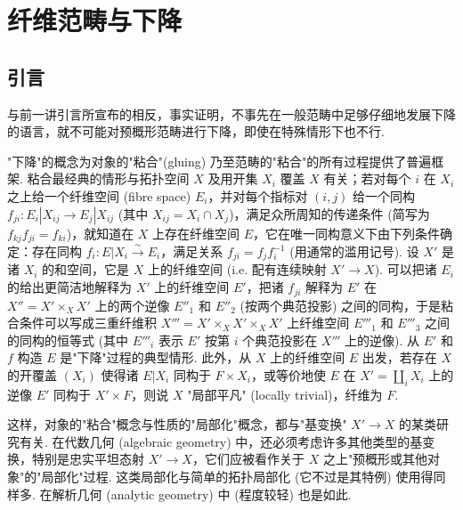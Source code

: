 \chapter{纤维范畴与下降}

\setcounter{section}{-1}

\section{引言}

与前一讲引言所宣布的相反，事实证明，不事先在一般范畴中足够仔细地发展下降的语言，就不可能对预概形范畴进行下降，即使在特殊情形下也不行.

"下降"的概念为对象的"粘合"(gluing) 乃至范畴的"粘合"的所有过程提供了普遍框架. 粘合最经典的情形与拓扑空间 $X$ 及用开集 $X_i$ 覆盖 $X$ 有关；若对每个 $i$ 在 $X_i$ 之上给一个纤维空间 (fibre space) $E_i$，并对每个指标对 $(i, j)$ 给一个同构 $f_{ji} \colon E_i|X_{ij} \to E_j|X_{ij}$ (其中 $X_{ij} = X_i \cap X_j$)，满足众所周知的传递条件 (简写为 $f_{kj} f_{ji} = f_{ki}$)，就知道在 $X$ 上存在纤维空间 $E$，它在唯一同构意义下由下列条件确定：存在同构 $f_i \colon E|X_i \xrightarrow{\sim} E_i$，满足关系 $f_{ji} = f_j f_i^{-1}$ (用通常的滥用记号). 设 $X'$ 是诸 $X_i$ 的和空间，它是 $X$ 上的纤维空间 (i.e. 配有连续映射 $X' \to X$). 可以把诸 $E_i$ 的给出更简洁地解释为 $X'$ 上的纤维空间 $E'$，把诸 $f_{ji}$ 解释为 $E'$ 在 $X'' = X' \times_X X'$ 上的两个逆像 $E''_1$ 和 $E''_2$ (按两个典范投影) 之间的同构，于是粘合条件可以写成三重纤维积 $X''' = X' \times_X X' \times_X X'$ 上纤维空间 $E'''_1$ 和 $E'''_3$ 之间的同构的恒等式 (其中 $E'''_i$ 表示 $E'$ 按第 $i$ 个典范投影在 $X'''$ 上的逆像). 从 $E'$ 和 $f$ 构造 $E$ 是"下降"过程的典型情形. 此外，从 $X$ 上的纤维空间 $E$ 出发，若存在 $X$ 的开覆盖 $(X_i)$ 使得诸 $E|X_i$ 同构于 $F \times X_i$，或等价地使 $E$ 在 $X' = \coprod_i X_i$ 上的逆像 $E'$ 同构于 $X' \times F$，则说 $X$ "局部平凡" (locally trivial)，纤维为 $F$.

这样，对象的"粘合"概念与性质的"局部化"概念，都与"基变换" $X' \to X$ 的某类研究有关. 在代数几何 (algebraic geometry) 中，还必须考虑许多其他类型的基变换，特别是忠实平坦态射 $X' \to X$，它们应被看作关于 $X$ 之上"预概形或其他对象"的"局部化"过程. 这类局部化与简单的拓扑局部化 (它不过是其特例) 使用得同样多. 在解析几何 (analytic geometry) 中 (程度较轻) 也是如此.

